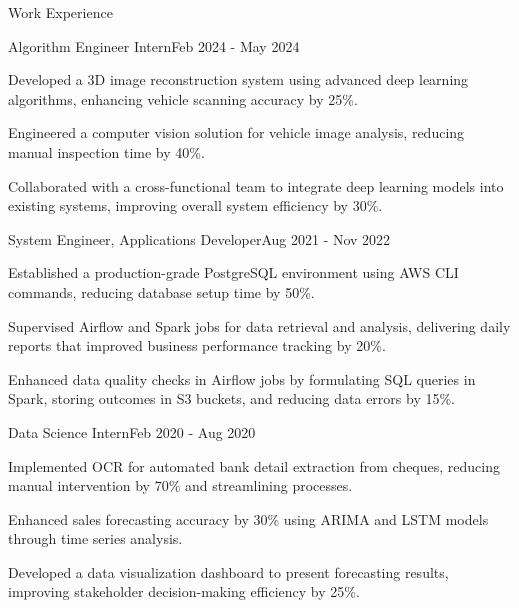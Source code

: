 \documentclass{resume} %
\begin{document}
    \begin{rSection}{Work Experience}
                    \begin{rSubsection}
                {Algorithm Engineer Intern}{Feb 2024 - May 2024}
                                    {}
                                {}
                                    \item Developed a 3D image reconstruction system using advanced deep learning algorithms, enhancing vehicle scanning accuracy by 25\%.
                                    \item Engineered a computer vision solution for vehicle image analysis, reducing manual inspection time by 40\%.
                                    \item Collaborated with a cross{-}functional team to integrate deep learning models into existing systems, improving overall system efficiency by 30\%.
                            \end{rSubsection}
                    \begin{rSubsection}
                {System Engineer, Applications Developer}{Aug 2021 - Nov 2022}
                                    {}
                                {}
                                    \item Established a production{-}grade PostgreSQL environment using AWS CLI commands, reducing database setup time by 50\%.
                                    \item Supervised Airflow and Spark jobs for data retrieval and analysis, delivering daily reports that improved business performance tracking by 20\%.
                                    \item Enhanced data quality checks in Airflow jobs by formulating SQL queries in Spark, storing outcomes in S3 buckets, and reducing data errors by 15\%.
                            \end{rSubsection}
                    \begin{rSubsection}
                {Data Science Intern}{Feb 2020 - Aug 2020}
                                    {}
                                {}
                                    \item Implemented OCR for automated bank detail extraction from cheques, reducing manual intervention by 70\% and streamlining processes.
                                    \item Enhanced sales forecasting accuracy by 30\% using ARIMA and LSTM models through time series analysis.
                                    \item Developed a data visualization dashboard to present forecasting results, improving stakeholder decision{-}making efficiency by 25\%.
                            \end{rSubsection}
            \end{rSection}
\end{document}
